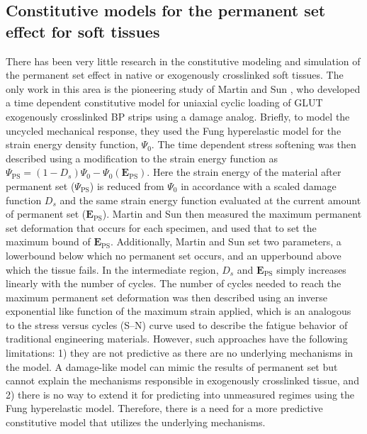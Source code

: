\subsection{Constitutive models for the permanent set effect for soft tissues}

	There has been very little research in the constitutive modeling and simulation of the permanent set effect in native or exogenously crosslinked soft tissues. 
	The only work in this area is the pioneering study of Martin and Sun \cite{martin_modeling_2013}, who developed a time dependent constitutive model for uniaxial cyclic loading of GLUT exogenously crosslinked BP strips using a damage analog. 
	Briefly, to model the uncycled mechanical response, they used the Fung hyperelastic model for the strain energy density function, $\Psi_0$. 
	The time dependent stress softening was then described using a modification to the strain energy function as $\Psi_\mathrm{PS} = (1-D_s)\Psi_0 - \Psi_0(\mathbf{E}_\mathrm{PS})$. 
	Here the strain energy of the material after permanent set ($\Psi_\mathrm{PS}$) is reduced from $\Psi_0$ in accordance with a scaled damage function $D_s$ and the same strain energy function evaluated at the current amount of permanent set ($\mathbf{E}_\mathrm{PS}$). 
	Martin and Sun then measured the maximum permanent set deformation that occurs for each specimen, and used that to set the maximum bound of $\mathbf{E}_\mathrm{PS}$. 
	Additionally, Martin and Sun set two parameters, a lowerbound below which no permanent set occurs, and an upperbound above which the tissue fails. 
	In the intermediate region, $D_s$ and $\mathbf{E}_\mathrm{PS}$ simply increases linearly with the number of cycles. 
	The number of cycles needed to reach the maximum permanent set deformation was then described using an inverse exponential like function of the maximum strain applied, which is an analogous to the stress versus cycles (S–N) curve used to describe the fatigue behavior of traditional engineering materials.
	However, such approaches have the following limitations: 
	1) they are not predictive as there are no underlying mechanisms in the model. 
	A damage-like model can mimic the results of permanent set but cannot explain the mechanisms responsible in exogenously crosslinked tissue, and 2) there is no way to extend it for predicting into unmeasured regimes using the Fung hyperelastic model. 
	Therefore, there is a need for a more predictive constitutive model that utilizes the underlying mechanisms.

	

